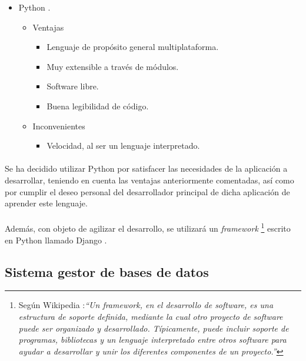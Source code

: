\begin{itemize}
\begin{itemize}
\begin{itemize}
            \end{itemize}
      \end{itemize}
    \item Python \cite{python}.
      \begin{itemize}
         \item Ventajas
            \begin{itemize}
             \item Lenguaje de propósito general multiplataforma.
             \item Muy extensible a través de módulos.
             \item Software libre.
             \item Buena legibilidad de código.
            \end{itemize}
         \item Inconvenientes
            \begin{itemize}
             \item Velocidad, al ser un lenguaje interpretado.
            \end{itemize}
      \end{itemize}
   \end{itemize}

   \paragraph{}Se ha decidido utilizar Python por satisfacer las necesidades
   de la aplicación a desarrollar, teniendo en cuenta las ventajas anteriormente
   comentadas, así como por cumplir el deseo personal del desarrollador
   principal de dicha aplicación de aprender este lenguaje.

   \paragraph{}Además, con objeto de agilizar el desarrollo, se utilizará
   un \textit{framework} \footnote{Según Wikipedia \cite{wikipedia}:\textit{``Un
   framework, en el desarrollo de software, es una estructura de soporte
   definida, mediante la cual otro proyecto de software puede ser organizado y
   desarrollado. Típicamente, puede incluir soporte de programas, bibliotecas y
   un lenguaje interpretado entre otros software para ayudar a desarrollar y
   unir los diferentes componentes de un proyecto.''}} escrito en Python llamado
   Django \cite{django}.

\subsection{Sistema gestor de bases de datos}

